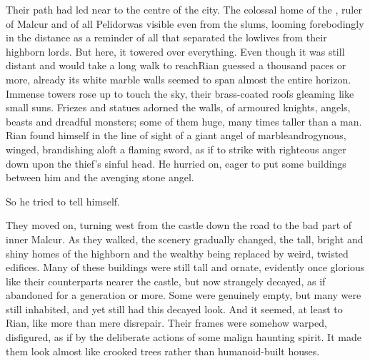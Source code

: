 Their path had led near to the centre of the city. The colossal \CastlePelidor{}\dash home of the \rayuth, ruler of Malcur and of all Pelidor\dash was visible even from the slums, looming forebodingly in the distance as a reminder of all that separated the lowlives from their highborn lords. But here, it towered over everything. Even though it was still distant and would take a long walk to reach\dash Rian guessed a thousand paces or more\dash, already its white marble walls seemed to span almost the entire horizon. Immense towers rose up to touch the sky, their brass-coated roofs gleaming like small suns. 
Friezes and statues adorned the walls, of armoured knights, angels, beasts and dreadful monsters; some of them huge, many times taller than a man. 
Rian found himself in the line of sight of a giant angel of marble\dash androgynous, winged, brandishing aloft a flaming sword, as if to strike with righteous anger down upon the thief's sinful head. He hurried on, eager to put some buildings between him and the avenging stone angel. 

 So he tried to tell himself. 









% 









They moved on, turning west from the castle down the road to the bad part of inner Malcur.  As they walked, the scenery gradually changed, the tall, bright and shiny homes of the highborn and the wealthy being replaced by weird, twisted edifices. Many of these buildings were still tall and ornate, evidently once glorious like their counterparts nearer the castle, but now strangely decayed, as if abandoned for a generation or more. Some were genuinely empty, but many were still inhabited, and yet still had this decayed look. 
And it seemed, at least to Rian, like more than mere disrepair. Their frames were somehow warped, disfigured, as if by the deliberate actions of some malign haunting spirit. It made them look almost like crooked trees rather than humanoid-built houses. 

